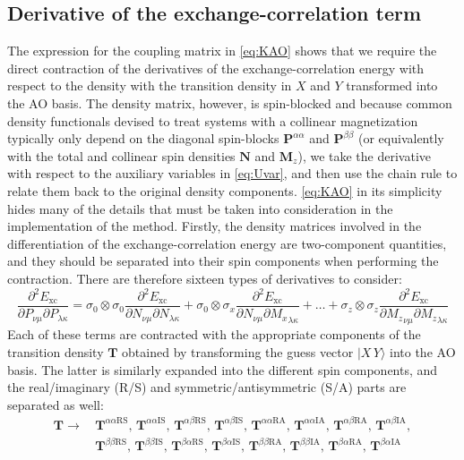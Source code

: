 \documentclass[12pt]{article}
\newcommand{\ket}[1]{\vert #1 \rangle}
\begin{document}
\subsection{Derivative of the exchange-correlation term}
The expression for the coupling matrix in \cref{eq:KAO} shows that we require the direct contraction of the derivatives of the exchange-correlation energy with respect to the density with the transition density in $X$ and $Y$ transformed into the AO basis.
The density matrix, however, is spin-blocked and because common density functionals devised to treat systems with a collinear magnetization typically only depend on the diagonal spin-blocks $\mathbf{P}^{\alpha\alpha}$ and $\mathbf{P}^{\beta\beta}$ (or equivalently with the total and collinear spin densities $\mathbf{N}$ and $\mathbf{M}_z$), we take the derivative with respect to the auxiliary variables in \cref{eq:Uvar}, and then use the chain rule to relate them back to the original density components.
\cref{eq:KAO} in its simplicity hides many of the details that must be taken into consideration in the implementation of the method.
Firstly, the density matrices involved in the differentiation of the exchange-correlation energy are two-component quantities, and they should be separated into their spin components when performing the contraction.
There are therefore sixteen types of derivatives to consider:
\begin{equation}
 \frac{\partial^2 E_\mathrm{xc}}{\partial P_{\nu\mu}\partial P_{\lambda\kappa}} = 
  \sigma_0\otimes\sigma_0\frac{\partial^2 E_\mathrm{xc}}{\partial N_{\nu\mu}\partial N_{\lambda\kappa}} +
  \sigma_0\otimes\sigma_x\frac{\partial^2 E_\mathrm{xc}}{\partial N_{\nu\mu}\partial {M_x}_{\lambda\kappa}} + \dots +
  \sigma_z\otimes\sigma_z\frac{\partial^2 E_\mathrm{xc}}{\partial {M_z}_{\nu\mu}\partial {M_z}_{\lambda\kappa}}
\end{equation}
Each of these terms are contracted with the appropriate components of the transition density $\mathbf{T}$ obtained by transforming the guess vector $\ket{X\,Y}$ into the AO basis.
The latter is similarly expanded into the different spin components, and the real/imaginary (R/S) and symmetric/antisymmetric (S/A) parts are separated as well:
\begin{equation}
\begin{split}
 \mathbf{T} \rightarrow&\,
   \mathbf{T}^{\alpha\alpha\mathrm{RS}},\,\mathbf{T}^{\alpha\alpha\mathrm{IS}},\,\mathbf{T}^{\alpha\beta\mathrm{RS}},\,\mathbf{T}^{\alpha\beta\mathrm{IS}},\,\mathbf{T}^{\alpha\alpha\mathrm{RA}},\,\mathbf{T}^{\alpha\alpha\mathrm{IA}},\,\mathbf{T}^{\alpha\beta\mathrm{RA}},\,\mathbf{T}^{\alpha\beta\mathrm{IA}}, \\
 &\, \mathbf{T}^{\beta\beta\mathrm{RS}},\,\mathbf{T}^{\beta\beta\mathrm{IS}},\,\mathbf{T}^{\beta\alpha\mathrm{RS}},\,\mathbf{T}^{\beta\alpha\mathrm{IS}},\,\mathbf{T}^{\beta\beta\mathrm{RA}},\,\mathbf{T}^{\beta\beta\mathrm{IA}},\,\mathbf{T}^{\beta\alpha\mathrm{RA}},\,\mathbf{T}^{\beta\alpha\mathrm{IA}}
\end{split}
\end{equation}
\end{document}
